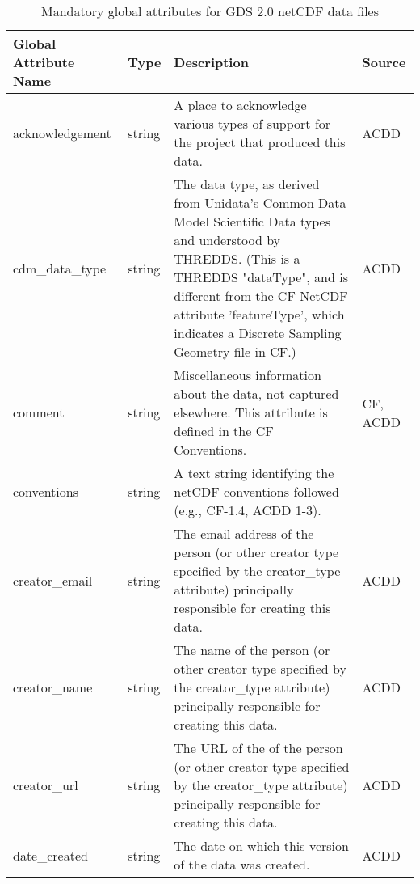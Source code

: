 \begin{longtable}{|p{}|p{}|p{}|p{}|}
\caption{Mandatory global attributes for GDS 2.0 netCDF data files}
\label{tab:global-attributes} \\ 
\hline \endhead
\hline \endfoot
\rowcolor{lightgray} \textbf{Global Attribute Name} & \textbf{Type} & \textbf{Description} & \textbf{Source} \\ \hline
\rowcolor{LightCyan} acknowledgement & string & A place to acknowledge various types of support for the project that produced this data. & ACDD \\ \hline

\rowcolor{LightCyan} cdm\_data\_type & string & The data type, as derived from Unidata's Common Data Model Scientific Data types and understood by THREDDS. (This is a THREDDS "dataType", and is different from the CF NetCDF attribute 'featureType', which indicates a Discrete Sampling Geometry file in CF.) & ACDD \\ \hline

\rowcolor{LightCyan} comment & string & Miscellaneous information about the data, not captured elsewhere. This attribute is defined in the CF Conventions. & CF, ACDD \\ \hline

\rowcolor{LightCyan} conventions & string & A text string identifying the netCDF conventions followed (e.g., CF-1.4, ACDD 1-3). &  \\ \hline

\rowcolor{LightCyan} creator\_email & string & The email address of the person (or other creator type specified by the creator\_type attribute) principally responsible for creating this data. & ACDD \\ \hline

\rowcolor{LightCyan} creator\_name & string & The name of the person (or other creator type specified by the creator\_type attribute) principally responsible for creating this data. & ACDD \\ \hline

\rowcolor{LightCyan} creator\_url & string & The URL of the of the person (or other creator type specified by the creator\_type attribute) principally responsible for creating this data. & ACDD \\ \hline

\rowcolor{LightCyan} date\_created & string & The date on which this version of the data was created. & ACDD \\ \hline


\end{longtable}

